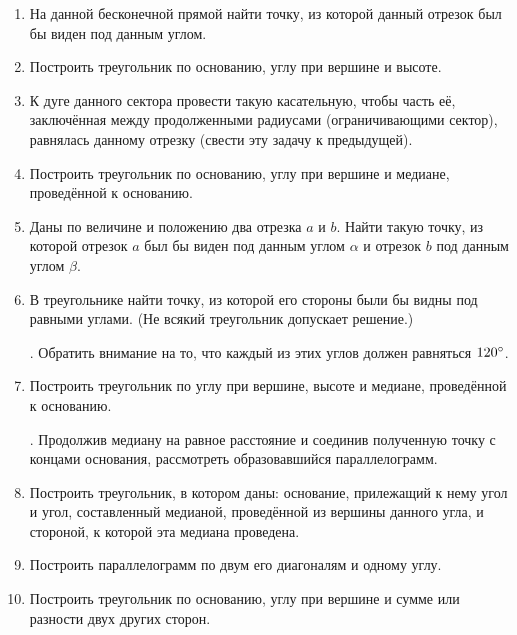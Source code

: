 \documentclass[twoside]{book}
\begin{document}
\begin{center}
\end{center}

\begin{enumerate}[resume]

 \item
На данной бесконечной прямой найти точку, из которой данный отрезок был бы виден под данным углом.

 \item
Построить треугольник по основанию, углу при вершине и высоте.

 \item
К дуге данного сектора провести такую касательную, чтобы часть её, заключённая между продолженными радиусами (ограничивающими сектор), равнялась данному отрезку (свести эту задачу к предыдущей).

 \item
Построить треугольник по основанию, углу при вершине и медиане, проведённой к основанию.

 \item
Даны по величине и положению два отрезка $a$ и $b$.
Найти такую точку, из которой отрезок $a$ был бы виден под данным углом $\alpha$ и отрезок $b$ под данным углом $\beta$.

 \item
В треугольнике найти точку, из которой его стороны были бы видны под равными углами.
(Не всякий треугольник допускает решение.)

\smallskip
{}.
Обратить внимание на то, что каждый из этих углов должен равняться $120\degree$.

 \item
Построить треугольник по углу при вершине, высоте и медиане, проведённой к основанию.

\smallskip
{}.
Продолжив медиану на равное расстояние и соединив полученную точку с концами основания, рассмотреть образовавшийся параллелограмм.

 \item
Построить треугольник, в котором даны:
основание, прилежащий к нему угол и угол, составленный медианой, проведённой из вершины данного угла, и стороной, к которой эта медиана проведена.

 \item
Построить параллелограмм по двум его диагоналям и одному углу.

 \item
Построить треугольник по основанию, углу при вершине и сумме или разности двух других сторон.


\end{enumerate}
\end{document}
